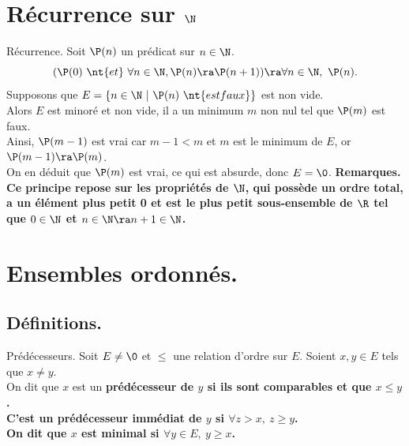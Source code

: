 \documentclass[french, 11pt]{article}
\begin{document}


\section{Récurrence sur \texorpdfstring{$\N$}{Lg}}

\begin{prop}{Récurrence.}{}
    Soit $\P(n)$ un prédicat sur $n\in\N$.
    \begin{equation*}
        (\P(0) ~ \nt{et} ~ \forall n\in\N, \P(n) \ra \P(n+1)) \ra \forall n\in\N, ~ \P(n).
    \end{equation*}
    \tcblower
    Supposons que $E=\{n\in\N ~ | ~ \P(n) ~ \nt{est faux}\}$ est non vide.\\
    Alors $E$ est minoré et non vide, il a un minimum $m$ non nul tel que $\P(m)$ est faux.\\
    Ainsi, $\P(m-1)$ est vrai car $m-1<m$ et $m$ est le minimum de $E$, or $\P(m-1)\ra \P(m)$.\\
    On en déduit que $\P(m)$ est vrai, ce qui est absurde, donc $E=\0$.\n
    \bf{Remarques.} Ce principe repose sur les propriétés de $\N$, qui possède un ordre total, a un élément plus petit 0 et est le plus petit sous-ensemble de $\R$ tel que $0\in\N$ et $n\in\N\ra n+1\in\N$.
\end{prop}

\vspace*{-0.4cm}

\section{Ensembles ordonnés.}
\subsection{Définitions.}

\begin{defi}{Prédécesseurs.}{}
    Soit $E\neq\0$ et $\leq$ une relation d'ordre sur $E$. Soient $x,y\in E$ tels que $x\neq y$.\\
    On dit que $x$ est un \bf{prédécesseur} de $y$ si ils sont comparables et que $x\leq y$.\\
    C'est un \bf{prédécesseur immédiat} de $y$ si $\forall z>x, ~ z\geq y$.\\
    On dit que $x$ est \bf{minimal} si $\forall y \in E, ~ y \geq x$.
\end{defi}

\vspace*{-0.4cm}
\end{document}
